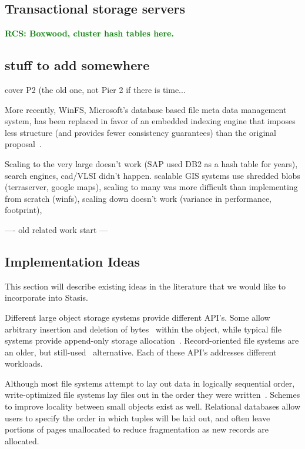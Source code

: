 \documentclass[letterpaper,twocolumn,10pt]{article}
\newcommand{\yad}{Stasis\xspace}
\newcommand{\rcs}[1]{\textcolor{green}{\bf RCS: #1}}
\begin{document}
\subsection{Transactional storage servers}

\rcs{Boxwood, cluster hash tables here.}

\subsection{stuff to add somewhere}

cover P2 (the old one, not Pier 2 if there is time...





More recently, WinFS, Microsoft's database based
file meta data management system, has been replaced in favor of an
embedded indexing engine that imposes less structure (and provides
fewer consistency guarantees) than the original
proposal~\cite{needtocitesomething}.

Scaling to the very large doesn't work (SAP used DB2 as a hash table
for years), search engines, cad/VLSI didn't happen.  scalable GIS
systems use shredded blobs (terraserver, google maps), scaling to many
was more difficult than implementing from scratch (winfs), scaling
down doesn't work (variance in performance, footprint),


---- old related work start ---
\subsection{Implementation Ideas}


This section
will describe existing ideas in the literature that we would like to
incorporate into \yad. 


Different large object storage systems provide different API's.
Some allow arbitrary insertion and deletion of bytes~\cite{esm}
within the object, while typical file systems
provide append-only storage allocation~\cite{ffs}.
Record-oriented file systems are an older, but still-used~\cite{gfs}
alternative. Each of these API's addresses 
different workloads.

Although most file systems attempt to lay out data in logically sequential
order, write-optimized file systems lay files out in the order they
were written~\cite{lfs}.  Schemes to improve locality between small
objects exist as well. Relational databases allow users to specify the order
in which tuples will be laid out, and often leave portions of pages
unallocated to reduce fragmentation as new records are allocated.
\end{document}
